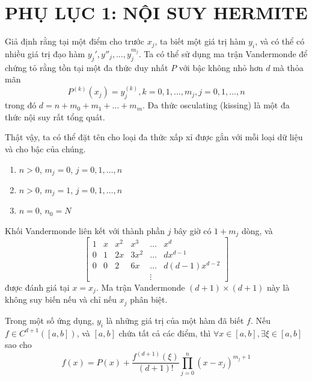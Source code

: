 \appendix

\chapter*{PHỤ LỤC 1: NỘI SUY HERMITE}

Giả định rằng tại một điểm cho trước $x_j$, ta biết một giá trị hàm $y_i$, và có thể có nhiều giá trị đạo hàm $y_j', y''_j, \dots, y_j^{m_j}$. Ta có thể sử dụng ma trận Vandermonde để chứng tỏ rằng tồn tại một đa thức duy nhất $P$ với bậc không nhỏ hơn $d$ mà thỏa mãn
\begin{equation}
    P^{(k)}(x_j) = y^{(k)}_j, k = 0, 1, \dots, m_j, j = 0, 1, \dots, n
\end{equation}
trong đó $d = n + m_0 + m_1 + \dots + m_m$. Đa thức osculating (kissing) là một đa thức nội suy rất tổng quát.

Thật vậy, ta có thể đặt tên cho loại đa thức xấp xỉ được gắn với mỗi loại dữ liệu và cho bậc của chúng.
\begin{enumerate}
    \item $n >0$, $m_j = 0$, $j = 0, 1, \dots, n$
    \item $n >0$, $m_j = 1$, $j = 0, 1, \dots, n$
    \item $n = 0$, $n_0 = N$
\end{enumerate}

Khối Vandermonde liên kết với thành phần $j$ bây giờ có $1 + m_j$ dòng, và
\begin{equation}
    \begin{bmatrix}
         1&  x&  x^2&  x^3& \dots & x^d\\ 
         0&  1&  2x&  3x^2& \dots&dx^{d-1}\\ 
         0&  0&  2&  6x&\dots &d(d-1)x^{d-2}\\ 
         &  &  &   & \vdots&
    \end{bmatrix}
\end{equation}
được đánh giá tại $x = x_j$. Ma trận Vandermonde $(d+1) \times (d+1)$ này là không suy biến nếu và chỉ nếu $x_j$ phân biệt.

Trong một số ứng dụng, $y_i$ là những giá trị của một hàm đã biết $f$. Nếu $f \in C^{d + 1}([a, b])$, và $[a, b]$ chứa tất cả các điểm, thì $\forall x \in [a, b], \exists\xi \in [a,b]$ sao cho
\begin{equation}
    f(x) = P(x) + \frac{f^{(d+1)}(\xi)}{(d+1)!}\prod_{j=0}^n(x-x_j)^{m_j+1}
\end{equation}

